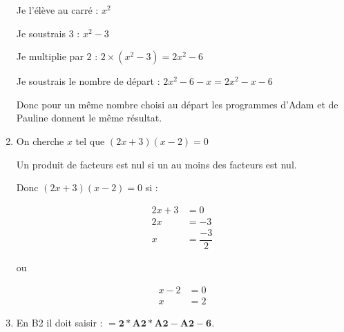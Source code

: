 \begin{enumerate}
	Je l’élève au carré : $x^2$
	
	Je soustrais $3$ : $x^2-3$
	
	Je multiplie par $2$ : $2\times (x^2-3) = 2x^2-6$
	
	Je soustrais le nombre de départ : $2x^2-6-x= 2x^2-x-6$
	
Donc pour un même nombre choisi au départ les programmes d’Adam et de Pauline donnent le même résultat.

\item On cherche $x$ tel que $(2x+3)(x-2)=0$

Un produit de facteurs est nul si un au moins des facteurs est nul.

Donc $(2x+3)(x-2)=0$ si :
\begin{minipage}{8cm}
\begin{align*}
2x+3 &= 0\\
2x &=-3\\
x &= \dfrac{-3}{2}
\end{align*}
\end{minipage}
\begin{minipage}{1cm}
ou
\end{minipage}
\begin{minipage}{8cm}
\begin{align*}
x-2 &=0\\
x &= 2
\end{align*}
\end{minipage}


\item En B2 il doit saisir : $\mathbf{= 2*A2*A2 - A2 - 6}$.
\end{enumerate}